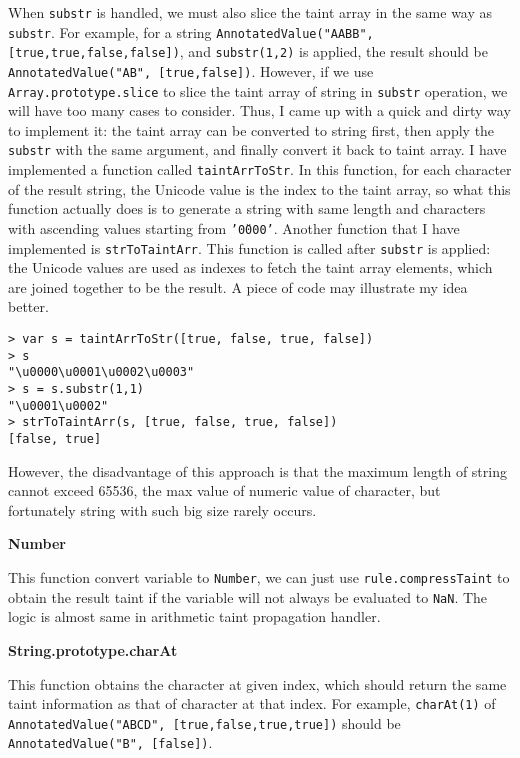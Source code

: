 {When \texttt{substr} is handled, we must also slice the taint array in the same way as \texttt{substr}. For example, for a string \texttt{AnnotatedValue("AABB", [true,true,false,false])}, and \texttt{substr(1,2)} is applied, the result should be \texttt{AnnotatedValue("AB", [true,false])}. However, if we use \texttt{Array.prototype.slice} to slice the taint array of string in \texttt{substr} operation, we will have too many cases to consider. Thus, I came up with a quick and dirty way to implement it: the taint array can be converted to string first, then apply the \texttt{substr} with the same argument, and finally convert it back to taint array. I have implemented a function called \texttt{taintArrToStr}. In this function, for each character of the result string, the Unicode value is the index to the taint array, so what this function actually does is to generate a string with same length and characters with ascending values starting from \texttt{'\u0000'}. Another function that I have implemented is \texttt{strToTaintArr}. This function is called after \texttt{substr} is applied: the Unicode values are used as indexes to fetch the taint array elements, which are joined together to be the result. A piece of code may illustrate my idea better.

\begin{verbatim}
> var s = taintArrToStr([true, false, true, false])
> s
"\u0000\u0001\u0002\u0003"
> s = s.substr(1,1)
"\u0001\u0002"
> strToTaintArr(s, [true, false, true, false])
[false, true]
\end{verbatim}

However, the disadvantage of this approach is that the maximum length of string cannot exceed 65536, the max value of numeric value of character, but fortunately string with such big size rarely occurs.

\textbf{Number}

This function convert variable to \texttt{Number}, we can just use \texttt{rule.compressTaint} to obtain the result taint if the variable will not always be evaluated to \texttt{NaN}. The logic is almost same in arithmetic taint propagation handler.

\textbf{String.prototype.charAt}

This function obtains the character at given index, which should return the same taint information as that of character at that index. For example, \texttt{charAt(1)} of \texttt{AnnotatedValue("ABCD", [true,false,true,true])} should be \texttt{AnnotatedValue("B", [false])}. 

}
